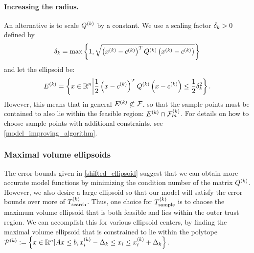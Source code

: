 \paragraph*{Increasing the radius.}
An alternative is to scale ${Q^{(k)}}$ by a constant.
We use a scaling factor $\delta_k > 0$ defined by
\begin{align*}
\delta_k = \max \left\{1, \sqrt{\left(x^{(k)} - c^{(k)} \right)^T {Q^{(k)}} \left(x^{(k)} - c^{(k)} \right)} \right\}
\end{align*}
and let the ellipsoid be:
\begin{align*}
{E^{(k)}} = \left\{x \in \mathbb R^n \bigg| \frac 1 2 \left(x - c^{(k)}\right)^T {Q^{(k)}} \left(x - c^{(k)}\right) \le \frac 1 2 \delta_k^2\right\}.
\end{align*}
However, this means that in general ${E^{(k)}} \not \subset {\mathcal F}$.
so that the sample points must be contained to also lie within the feasible region: ${E^{(k)}} \cap {\mathcal F_m^{(k)}}$.
For details on how to choose sample points with additional constraints, see \cref{model_improving_algorithm}.




\subsubsection{Maximal volume ellipsoids}
\label{ellipse_optimization}

The error bounds given in \cref{shifted_ellipsoid} suggest that we can obtain more accurate model functions by 
minimizing the condition number of the matrix ${Q^{(k)}}$.
However, we also desire a large ellipsoid so that our model will satisfy the error bounds over more of ${T_{\text{search}}^{(k)}}$.
Thus, one choice for ${T_{\text{sample}}^{(k)}}$ is to choose the maximum volume ellipsoid that is both feasible and lies within the outer trust region.
We can accomplish this for various ellipsoid centers, by finding the maximal volume ellipsoid that is constrained to lie within the polytope
${{\mathcal{P}}^{(k)}} := \left\{x \in \mathbb R^n | {A} x\le {b},   x_i^{(k)} - \Delta_k \le x_i \le x_i^{(k)} + \Delta_k\right\}.$

